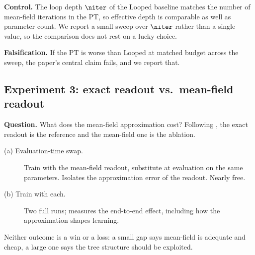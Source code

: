 \textbf{Control.} The loop depth $\niter$ of the Looped baseline matches the number of
mean-field iterations in the PT, so effective depth is comparable as well as parameter count.
We report a small sweep over $\niter$ rather than a single value, so the comparison does not
rest on a lucky choice.

\textbf{Falsification.} If the PT is worse than Looped at matched budget across the sweep, the
paper's central claim fails, and we report that. 


\subsection{Experiment 3: exact readout vs.\ mean-field readout}
\label{sec:exp3}

\textbf{Question.} What does the mean-field approximation cost? Following ,
the exact readout is the reference and the mean-field one is the ablation.

\begin{description}
  \item[(a) Evaluation-time swap.] Train with the mean-field readout, substitute
         at evaluation on the same parameters. Isolates the
        approximation error of the readout. Nearly free.
  \item[(b) Train with each.] Two full runs; measures the end-to-end effect, including how the
        approximation shapes learning.
\end{description}

Neither outcome is a win or a loss: a small gap says mean-field is adequate and cheap, a large
one says the tree structure should be exploited. 

